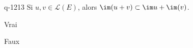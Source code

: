 \begin{truefalse}{q-1213}
Si $u,v\in\mathcal{L}(E)$, alors $\im(u+v) \subset \im u+ \im(v)$.
\item* Vrai
\item Faux
\end{truefalse}

